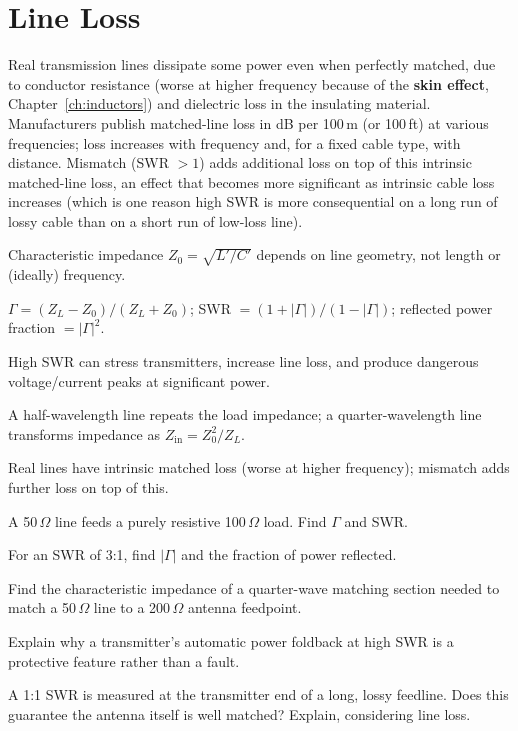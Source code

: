 \section{Line Loss}

Real transmission lines dissipate some power even when perfectly
matched, due to conductor resistance (worse at higher frequency because
of the \textbf{skin effect}, Chapter~\ref{ch:inductors}) and dielectric
loss in the insulating material. Manufacturers publish matched-line
loss in dB per 100\,m (or 100\,ft) at various frequencies; loss
increases with frequency and, for a fixed cable type, with distance.
Mismatch (SWR $>1$) adds additional loss on top of this intrinsic
matched-line loss, an effect that becomes more significant as intrinsic
cable loss increases (which is one reason high SWR is more consequential
on a long run of lossy cable than on a short run of low-loss line).

\begin{quickreview}
\item Characteristic impedance $Z_0 = \sqrt{L'/C'}$ depends on line
geometry, not length or (ideally) frequency.
\item $\Gamma = (Z_L-Z_0)/(Z_L+Z_0)$; SWR $=(1+|\Gamma|)/(1-|\Gamma|)$;
reflected power fraction $=|\Gamma|^2$.
\item High SWR can stress transmitters, increase line loss, and produce
dangerous voltage/current peaks at significant power.
\item A half-wavelength line repeats the load impedance; a
quarter-wavelength line transforms impedance as
$Z_{\text{in}} = Z_0^2/Z_L$.
\item Real lines have intrinsic matched loss (worse at higher
frequency); mismatch adds further loss on top of this.
\end{quickreview}

\begin{practiceproblems}
\item A 50\,$\Omega$ line feeds a purely resistive 100\,$\Omega$ load.
Find $\Gamma$ and SWR.
\item For an SWR of 3:1, find $|\Gamma|$ and the fraction of power
reflected.
\item Find the characteristic impedance of a quarter-wave matching
section needed to match a 50\,$\Omega$ line to a 200\,$\Omega$ antenna
feedpoint.
\item Explain why a transmitter's automatic power foldback at high SWR
is a protective feature rather than a fault.
\item A 1:1 SWR is measured at the transmitter end of a long, lossy
feedline. Does this guarantee the antenna itself is well matched?
Explain, considering line loss.
\end{practiceproblems}
